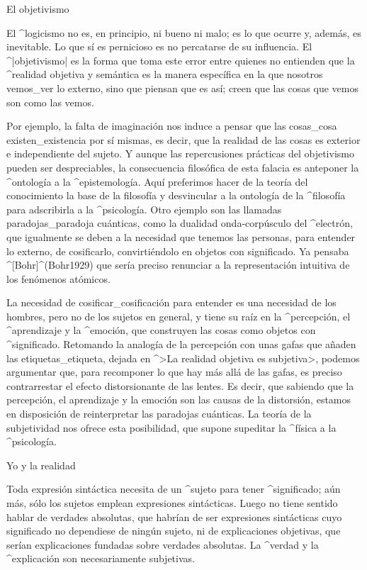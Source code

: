 \Section El objetivismo

El ^{logicismo} no es, en principio, ni bueno ni malo; es lo que ocurre
y, además, es inevitable. Lo que sí es pernicioso es no percatarse de su
influencia. El ^|objetivismo| es la forma que toma este error entre
quienes no entienden que la ^{realidad} objetiva y semántica es la
manera específica en la que nosotros vemos_{ver} lo externo, sino que
piensan que es así; creen que las cosas que vemos son como las vemos.

Por ejemplo, la falta de imaginación nos induce a pensar que las
cosas_{cosa} existen_{existencia} por sí mismas, es decir, que la
realidad de las cosas es exterior e independiente del sujeto. Y aunque
las repercusiones prácticas del objetivismo pueden ser despreciables, la
consecuencia filosófica de esta falacia es anteponer la ^{ontología} a
la ^{epistemología}. Aquí preferimos hacer de la teoría del conocimiento
la base de la filosofía y desvincular a la ontología de la ^{filosofía}
para adscribirla a la ^{psicología}. Otro ejemplo son las llamadas
paradojas_{paradoja} cuánticas, como la dualidad onda-corpúsculo del
^{electrón}, que igualmente se deben a la necesidad que tenemos las
personas, para entender lo externo, de cosificarlo, convirtiéndolo en
objetos con significado. Ya pensaba ^[Bohr]^(Bohr1929) que sería preciso
renunciar a la representación intuitiva de los fenómenos atómicos.

La necesidad de cosificar_{cosificación} para entender es una necesidad
de los hombres, pero no de los sujetos en general, y tiene su raíz en la
^{percepción}, el ^{aprendizaje} y la ^{emoción}, que construyen las
cosas como objetos con ^{significado}. Retomando la analogía de la
percepción con unas gafas que añaden las etiquetas_{etiqueta}, dejada en
^>La realidad objetiva es subjetiva>, podemos argumentar que, para
recomponer lo que hay más allá de las gafas, es preciso contrarrestar el
efecto distorsionante de las lentes. Es decir, que sabiendo que la
percepción, el aprendizaje y la emoción son las causas de la distorsión,
estamos en disposición de reinterpretar las paradojas cuánticas. La
teoría de la subjetividad nos ofrece esta posibilidad, que supone
supeditar la ^{física} a la ^{psicología}.


\Section Yo y la realidad

Toda expresión sintáctica necesita de un ^{sujeto} para tener
^{significado}; aún más, sólo los sujetos emplean expresiones
sintácticas. Luego no tiene sentido hablar de verdades absolutas, que
habrían de ser expresiones sintácticas cuyo significado no dependiese de
ningún sujeto, ni de explicaciones objetivas, que serían explicaciones
fundadas sobre verdades absolutas. La ^{verdad} y la ^{explicación} son
necesariamente subjetivas.

